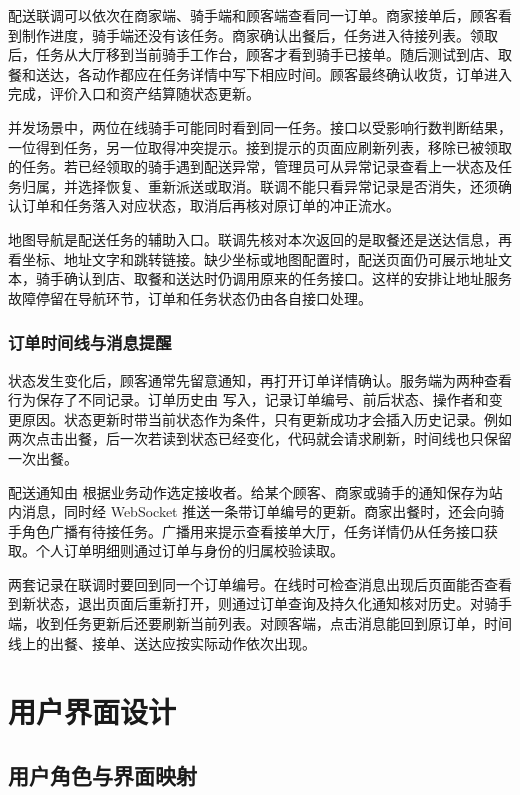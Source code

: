 配送联调可以依次在商家端、骑手端和顾客端查看同一订单。商家接单后，顾客看到制作进度，骑手端还没有该任务。商家确认出餐后，任务进入待接列表。领取后，任务从大厅移到当前骑手工作台，顾客才看到骑手已接单。随后测试到店、取餐和送达，各动作都应在任务详情中写下相应时间。顾客最终确认收货，订单进入完成，评价入口和资产结算随状态更新。

并发场景中，两位在线骑手可能同时看到同一任务。接口以受影响行数判断结果，一位得到任务，另一位取得冲突提示。接到提示的页面应刷新列表，移除已被领取的任务。若已经领取的骑手遇到配送异常，管理员可从异常记录查看上一状态及任务归属，并选择恢复、重新派送或取消。联调不能只看异常记录是否消失，还须确认订单和任务落入对应状态，取消后再核对原订单的冲正流水。

地图导航是配送任务的辅助入口。联调先核对本次返回的是取餐还是送达信息，再看坐标、地址文字和跳转链接。缺少坐标或地图配置时，配送页面仍可展示地址文本，骑手确认到店、取餐和送达时仍调用原来的任务接口。这样的安排让地址服务故障停留在导航环节，订单和任务状态仍由各自接口处理。

\subsubsection{订单时间线与消息提醒}

状态发生变化后，顾客通常先留意通知，再打开订单详情确认。服务端为两种查看行为保存了不同记录。订单历史由  写入，记录订单编号、前后状态、操作者和变更原因。状态更新时带当前状态作为条件，只有更新成功才会插入历史记录。例如两次点击出餐，后一次若读到状态已经变化，代码就会请求刷新，时间线也只保留一次出餐。

配送通知由  根据业务动作选定接收者。给某个顾客、商家或骑手的通知保存为站内消息，同时经 WebSocket 推送一条带订单编号的更新。商家出餐时，还会向骑手角色广播有待接任务。广播用来提示查看接单大厅，任务详情仍从任务接口获取。个人订单明细则通过订单与身份的归属校验读取。

两套记录在联调时要回到同一个订单编号。在线时可检查消息出现后页面能否查看到新状态，退出页面后重新打开，则通过订单查询及持久化通知核对历史。对骑手端，收到任务更新后还要刷新当前列表。对顾客端，点击消息能回到原订单，时间线上的出餐、接单、送达应按实际动作依次出现。

\section{用户界面设计}

\subsection{用户角色与界面映射}


